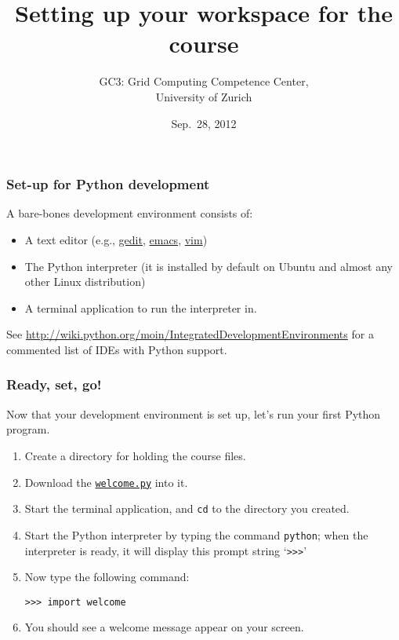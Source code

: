 \documentclass[english,serif,mathserif,xcolor=pdftex,dvipsnames,table]{beamer}
\title[Set-up]{%
  Setting up your workspace for the course
}
\author[GC3]{%
  GC3: Grid Computing Competence Center, \\
  University of Zurich
}
\date{Sep.~28, 2012}
\begin{document}
\maketitle


\begin{frame}
  \frametitle{Set-up for Python development}
  A bare-bones development environment consists of:
  \begin{itemize}
  \item A text editor (e.g.,
    \href{http://en.wikipedia.org/wiki/Gedit}{gedit},
    \href{http://hide1713.wordpress.com/2009/01/30/setup-perfect-python-environment-in-emacs/}{emacs},
    \href{http://blog.dispatched.ch/2009/05/24/vim-as-python-ide/}{vim})
  \item The Python interpreter (it is installed by default on
    Ubuntu and almost any other Linux distribution)
  \item A terminal application to run the interpreter in.
  \end{itemize}

  \+ See
  {\small \url{http://wiki.python.org/moin/IntegratedDevelopmentEnvironments}}
  for a commented list of {IDEs} with Python support.
\end{frame}


\begin{frame}[fragile]
  \frametitle{Ready, set, go!}

  Now that your development environment is set up, let's run your
  first Python program.
  \begin{enumerate}
  \item Create a directory for holding the course files.
  \item Download the \href{http://www.gc3.uzh.ch/welcome.py}{\texttt{welcome.py}} into it.
  \item Start the terminal application, and \texttt{cd} to the directory you created.
  \item Start the Python interpreter by typing the command \texttt{python}; when the interpreter is ready, it will display this prompt string `\texttt{>>>}'
  \item Now type the following command:
    \begin{lstlisting}
>>> import welcome
    \end{lstlisting}
  \item You should see a welcome message appear on your screen.
  \end{enumerate}

\end{frame}
\end{document}

